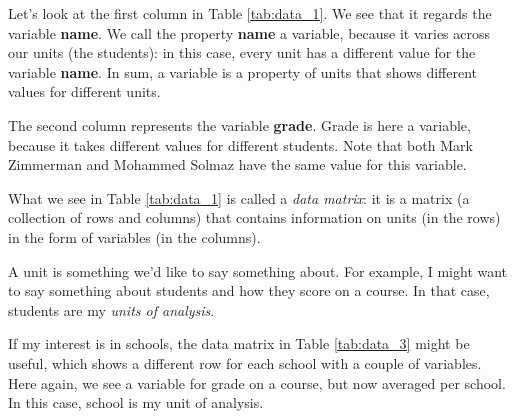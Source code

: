 \documentclass[]{book}\usepackage[]{graphicx}\usepackage[]{color}
\begin{document}
Let's look at the first column in Table \ref{tab:data_1}. We see that it regards the variable \textbf{name}. We call the property \textbf{name} a variable, because it varies across our units (the students): in this case, every unit has a different value for the variable \textbf{name}. In sum, a variable is a property of units that shows different values for different units.

The second column represents the variable \textbf{grade}. Grade is here a variable, because it takes different values for different students. Note that both Mark Zimmerman and Mohammed Solmaz have the same value for this variable.

What we see in Table \ref{tab:data_1} is called a \textit{data matrix}: it is a matrix (a collection of rows and columns) that contains information on units (in the rows) in the form of variables (in the columns).

A unit is something we'd like to say something about. For example, I might want to say something about students and how they score on a course. In that case, students are my \textit{units of analysis}.

%

If my interest is in schools, the data matrix in Table \ref{tab:data_3} might be useful, which shows a different row for each school with a couple of variables. Here again, we see a variable for grade on a course, but now averaged per school. In this case, school is my unit of analysis.
\end{document}
